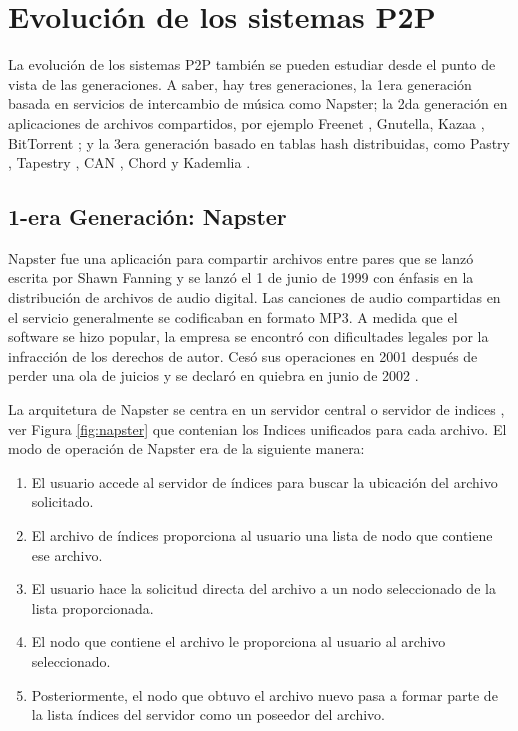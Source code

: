  \section{Evoluci\'on de los sistemas P2P}
La evoluci\'on de los sistemas P2P tambi\'en se pueden estudiar desde el punto de vista de las generaciones. A saber, hay tres generaciones, la 1era generaci\'on basada en servicios de intercambio de m\'usica como Napster; la 2da generaci\'on en aplicaciones de archivos compartidos, por ejemplo Freenet \cite{Clarke2001}, Gnutella, Kazaa \cite{Leibowitz2003}, BitTorrent \cite{Cohen2003}; y la 3era generaci\'on basado en tablas hash distribuidas, como  Pastry  \cite{Rowstron2001}, Tapestry   \cite{Zhao2001}, 
CAN  \cite{Ratnasamy2001}, Chord   \cite{Stoica2001} y Kademlia  \cite{Maymounkov2002}.



 \subsection{ 1-era Generación: Napster}  
  	   	
  	
 Napster fue una aplicación para compartir archivos entre pares que se lanzó escrita  por Shawn Fanning \cite{Eberspaecher2005}  y se lanz\'o el 1 de junio de 1999 con énfasis en la distribución de archivos de audio digital. Las canciones de audio compartidas en el servicio generalmente se codificaban en formato MP3.  A medida que el software se hizo popular, la empresa se encontró con dificultades legales por la infracción de los derechos de autor. Cesó sus operaciones en 2001 después de perder una ola de juicios y se declaró en quiebra en junio de 2002 \cite{Coulouris2011} 	\cite{Eberspaecher2005} \cite{Eberspaecher2005a}.
 
 La arquitetura de Napster se centra en un servidor central o  
 servidor de indices , ver Figura \ref{fig:napster} que contenian los 
 Indices unificados para cada archivo.  
 El modo de operaci\'on de Napster era de la siguiente manera:
 
 \begin{enumerate}
 	\item El usuario accede al servidor de \'indices para buscar la ubicaci\'on del archivo solicitado.
 	\item El archivo de \'indices proporciona al usuario una lista de nodo que contiene ese archivo.
 	\item El usuario  hace la solicitud directa  del archivo a un nodo seleccionado de la lista proporcionada. 
 	\item El nodo que contiene el archivo le proporciona al usuario al archivo seleccionado.
 	\item Posteriormente, el nodo que obtuvo el archivo nuevo pasa a formar parte de la lista \'indices del servidor como un poseedor del archivo.
 \end{enumerate}
 
